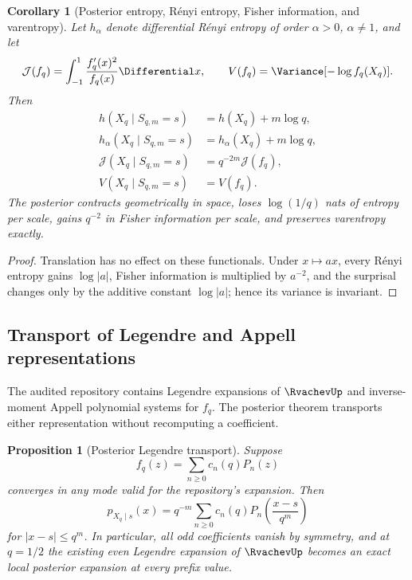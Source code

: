 \documentclass[11pt,oneside]{article}
\newtheorem{proposition}[theorem]{Proposition}
\newtheorem{corollary}[theorem]{Corollary}
\theoremstyle{definition}
\theoremstyle{remark}
\begin{document}
\begin{corollary}[Posterior entropy, R\'enyi entropy, Fisher information, and varentropy]
\label{cor:posterior-functionals}
Let $h_\alpha$ denote differential R\'enyi entropy of order $\alpha>0$,
$\alpha\ne1$, and let
\[
 \mathcal J(f_q)=\int_{-1}^{1}\frac{f_q'(x)^2}{f_q(x)}\Differential x,
 \qquad
 V(f_q)=\Variance[-\log f_q(X_q)].
\]
Then
\begin{align}
 h(X_q\mid S_{q,m}=s)&=h(X_q)+m\log q,\label{eq:post-h}\\
 h_\alpha(X_q\mid S_{q,m}=s)&=h_\alpha(X_q)+m\log q,\label{eq:post-renyi}\\
 \mathcal J(X_q\mid S_{q,m}=s)&=q^{-2m}\mathcal J(f_q),\label{eq:post-fisher}\\
 V(X_q\mid S_{q,m}=s)&=V(f_q).\label{eq:post-varentropy}
\end{align}
The posterior contracts geometrically in space, loses $\log(1/q)$ nats of entropy
per scale, gains $q^{-2}$ in Fisher information per scale, and preserves
varentropy exactly.
\end{corollary}

\begin{proof}
Translation has no effect on these functionals.  Under $x\mapsto ax$, every
R\'enyi entropy gains $\log|a|$, Fisher information is multiplied by $a^{-2}$,
and the surprisal changes only by the additive constant $\log|a|$; hence its
variance is invariant.
\end{proof}

\subsection{Transport of Legendre and Appell representations}

The audited repository contains Legendre expansions of $\RvachevUp$ and inverse-moment
Appell polynomial systems for $f_q$.  The posterior theorem transports either
representation without recomputing a coefficient.

\begin{proposition}[Posterior Legendre transport]
\label{prop:legendre-posterior}
Suppose
\begin{equation}
 f_q(z)=\sum_{n\ge0}c_n(q)P_n(z)
 \label{eq:legendre-fq}
\end{equation}
converges in any mode valid for the repository's expansion.  Then
\begin{equation}
 p_{X_q\mid s}(x)
 =q^{-m}\sum_{n\ge0}c_n(q)
 P_n\!\left(\frac{x-s}{q^m}\right)
 \label{eq:legendre-posterior}
\end{equation}
for $|x-s|\le q^m$.  In particular, all odd coefficients vanish by symmetry, and
at $q=1/2$ the existing even Legendre expansion of $\RvachevUp$ becomes an exact local
posterior expansion at every prefix value.
\end{proposition}
\end{document}
